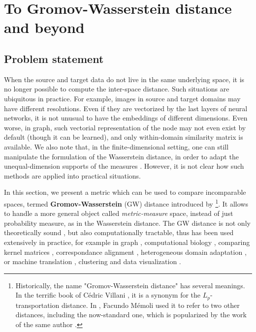 \section{To Gromov-Wasserstein distance and beyond} \label{sec:gw}

\subsection{Problem statement}

When the source and target data do not live in the same underlying space, it is no longer possible
to compute the inter-space distance. Such situations are ubiquitous in practice.
For example, images in source and target domains may have different resolutions. Even if they
are vectorized by the last layers of neural networks, it is not unusual to have the
embeddings of different dimensions. Even worse, in graph,
such vectorial representation of the node may not even exist by default
(though it can be learned), and only within-domain similarity matrix is available.
We also note that, in the finite-dimensional setting,
one can still manipulate the formulation of the Wasserstein distance,
in order to adapt the unequal-dimension supports of the measures \citep{Cai22,McCann20}.
However, it is not clear how such methods are applied into practical situations.

In this section, we present a metric which can be used to compare incomparable spaces,
termed \textbf{Gromov-Wasserstein} (GW) distance introduced by \citep{Memoli07,Memoli11}
\footnote{Historically, the name "Gromov-Wasserstein distance" has several meanings.
In the terrific book of Cédric Villani \citep{Villani08}, it is a synonym
for the $L_p$-transportation distance. In \citep{Memoli11b},
Facundo Mémoli used it to refer to two other distances, including the now-standard one, which is
popularized by the work of the same author \citep{Memoli11}.}. It allows to handle a more general
object called \textit{metric-measure} space, instead of just probability measure, as in
the Wasserstein distance. The GW distance is not only theoretically sound \citep{Memoli11,Sturm12},
but also computationally tractable, thus has been used extensively in practice,
for example in graph \citep{Vayer19b,Xu19,Xu19b,Chowdhury20,Vincent21},
computational biology \citep{Demetci20}, comparing kernel matrices \citep{Peyre16},
correspondance alignment \citep{Solomon16}, heterogeneous domain adaptation \citep{Yan18},
or machine translation \citep{Melis18}, clustering and data visualization \citep{Ryner22}.

